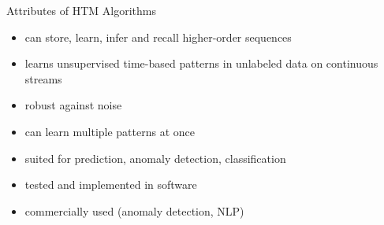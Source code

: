 \begin{frame}[c]{Attributes of HTM Algorithms}
    \begin{itemize}[<+(1)->]
        \item can store, learn, infer and recall higher-order sequences
        \item learns unsupervised time-based patterns in unlabeled data on continuous streams
        \item robust against noise
        \item can learn multiple patterns at once
        \item suited for prediction, anomaly detection, classification
        \item tested and implemented in software
        \item commercially used (anomaly detection, NLP)
    \end{itemize}
\end{frame}



